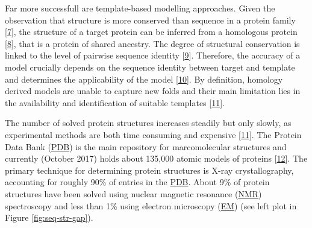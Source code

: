 \documentclass[11pt,a4paper,twoside]{book}
\theoremstyle{definition}
\theoremstyle{definition}
\theoremstyle{remark}
\begin{document}
Far more successfull are template-based modelling approaches. Given the
observation that structure is more conserved than sequence in a protein
family {[}\protect\hyperlink{ref-Lesk1980}{7}{]}, the structure of a
target protein can be inferred from a homologous protein
{[}\protect\hyperlink{ref-Sander1991}{8}{]}, that is a protein of shared
ancestry. The degree of structural conservation is linked to the level
of pairwise sequence identity
{[}\protect\hyperlink{ref-Chothia1986}{9}{]}. Therefore, the accuracy of
a model crucially depends on the sequence identity between target and
template and determines the applicability of the model
{[}\protect\hyperlink{ref-Marti-Renom2000}{10}{]}. By definition,
homology derived models are unable to capture new folds and their main
limitation lies in the availability and identification of suitable
templates {[}\protect\hyperlink{ref-Dorn2014}{11}{]}.

The number of solved protein structures increases steadily but only
slowly, as experimental methods are both time consuming and expensive
{[}\protect\hyperlink{ref-Dorn2014}{11}{]}. The Protein Data Bank
(\protect\hyperlink{abbrev}{PDB}) is the main repository for
marcomolecular structures and currently (October 2017) holds about
135,000 atomic models of proteins
{[}\protect\hyperlink{ref-Berman2000}{12}{]}. The primary technique for
determining protein structures is X-ray crystallography, accounting for
roughly 90\% of entries in the \protect\hyperlink{abbrev}{PDB}. About
9\% of protein structures have been solved using nuclear magnetic
resonance (\protect\hyperlink{abbrev}{NMR}) spectroscopy and less than
1\% using electron microscopy (\protect\hyperlink{abbrev}{EM}) (see left
plot in Figure \ref{fig:seq-str-gap}).
\end{document}
